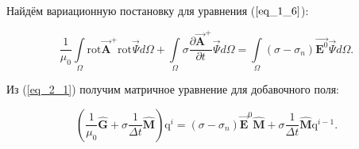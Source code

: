 Найдём вариационную постановку для уравнения ($\ref{eq_1_6}$):

\begin{equation} \label{eq_2_1}
	\frac{1}{\mu_0} \int \limits_{\Omega} \text{rot} \overrightarrow{\textbf{A}}^+ \text{rot} \overrightarrow{\Psi} d \Omega + \int \limits_{\Omega} \sigma \frac{\partial \overrightarrow{\textbf{A}}^+}{\partial t} \overrightarrow{\Psi} d \Omega = \int \limits_{\Omega}(\sigma - \sigma_n) \overrightarrow{\textbf{E}^0} \overrightarrow{\Psi} d \Omega.
\end{equation}

Из (\ref{eq_2_1}) получим матричное уравнение для добавочного поля:

\begin{equation} \label{eq_2_2}
	\left(\frac{1}{\mu_0} \hat{\textbf{G}} + \sigma \frac{1}{\Delta t} \hat{\textbf{M}} \right) \text{q}^i = (\sigma - \sigma_n) \overrightarrow{\textbf{E}}^0 \hat{\textbf{M}} + \sigma \frac{1}{\Delta t} \hat{\textbf{M}}\text{q}^{i-1}.
\end{equation}